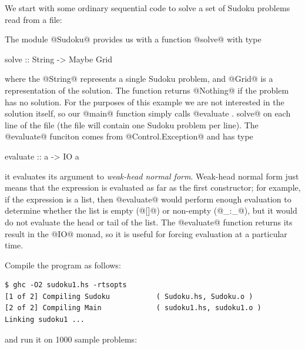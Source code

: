 We start with some ordinary sequential code to solve a set of Sudoku
problems read from a file:


The module @Sudoku@ provides us with a function @solve@ with type

\begin{haskell}
solve :: String -> Maybe Grid
\end{haskell}

\noindent where the @String@ represents a single Sudoku problem, and
@Grid@ is a representation of the solution.  The function returns
@Nothing@ if the problem has no solution.  For the purposes of this
example we are not interested in the solution itself, so our @main@
function simply calls @evaluate . solve@ on each line of the file (the
file will contain one Sudoku problem per line).  The @evaluate@
funciton comes from @Control.Exception@ and has type

\begin{haskell}
evaluate :: a -> IO a
\end{haskell}

\noindent it evaluates its argument to \emph{weak-head normal form}.
Weak-head normal form just means that the expression is evaluated as
far as the first constructor; for example, if the expression is a
list, then @evaluate@ would perform enough evaluation to determine
whether the list is empty (@[]@) or non-empty (@_:_@), but it would
do not evaluate the head or tail of the list.  The @evaluate@ function
returns its result in the @IO@ monad, so it is useful for forcing
evaluation at a particular time.

Compile the program as follows:

{\small \begin{verbatim}
$ ghc -O2 sudoku1.hs -rtsopts
[1 of 2] Compiling Sudoku           ( Sudoku.hs, Sudoku.o )
[2 of 2] Compiling Main             ( sudoku1.hs, sudoku1.o )
Linking sudoku1 ...
\end{verbatim}}

\noindent and run it on 1000 sample problems:

